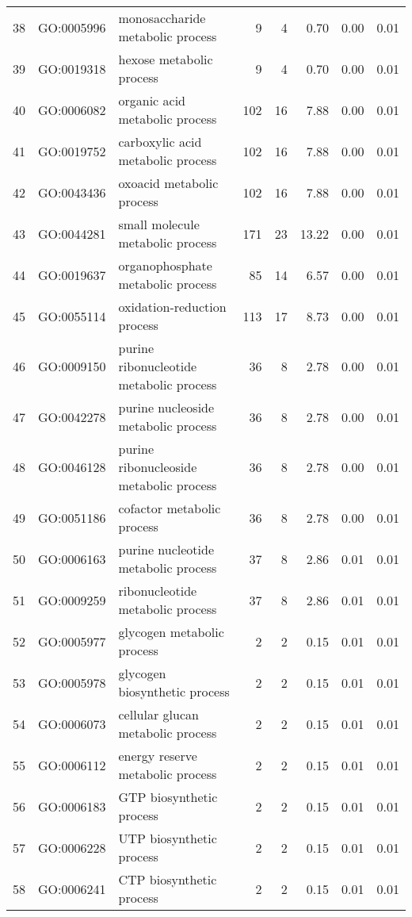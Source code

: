 \begin{table}[ht]
\begin{tabular}{rllrrrrr}
  38 & GO:0005996 & monosaccharide metabolic process &   9 &   4 & 0.70 & 0.00 & 0.01 \\ 
  39 & GO:0019318 & hexose metabolic process &   9 &   4 & 0.70 & 0.00 & 0.01 \\ 
  40 & GO:0006082 & organic acid metabolic process & 102 &  16 & 7.88 & 0.00 & 0.01 \\ 
  41 & GO:0019752 & carboxylic acid metabolic process & 102 &  16 & 7.88 & 0.00 & 0.01 \\ 
  42 & GO:0043436 & oxoacid metabolic process & 102 &  16 & 7.88 & 0.00 & 0.01 \\ 
  43 & GO:0044281 & small molecule metabolic process & 171 &  23 & 13.22 & 0.00 & 0.01 \\ 
  44 & GO:0019637 & organophosphate metabolic process &  85 &  14 & 6.57 & 0.00 & 0.01 \\ 
  45 & GO:0055114 & oxidation-reduction process & 113 &  17 & 8.73 & 0.00 & 0.01 \\ 
  46 & GO:0009150 & purine ribonucleotide metabolic process &  36 &   8 & 2.78 & 0.00 & 0.01 \\ 
  47 & GO:0042278 & purine nucleoside metabolic process &  36 &   8 & 2.78 & 0.00 & 0.01 \\ 
  48 & GO:0046128 & purine ribonucleoside metabolic process &  36 &   8 & 2.78 & 0.00 & 0.01 \\ 
  49 & GO:0051186 & cofactor metabolic process &  36 &   8 & 2.78 & 0.00 & 0.01 \\ 
  50 & GO:0006163 & purine nucleotide metabolic process &  37 &   8 & 2.86 & 0.01 & 0.01 \\ 
  51 & GO:0009259 & ribonucleotide metabolic process &  37 &   8 & 2.86 & 0.01 & 0.01 \\ 
  52 & GO:0005977 & glycogen metabolic process &   2 &   2 & 0.15 & 0.01 & 0.01 \\ 
  53 & GO:0005978 & glycogen biosynthetic process &   2 &   2 & 0.15 & 0.01 & 0.01 \\ 
  54 & GO:0006073 & cellular glucan metabolic process &   2 &   2 & 0.15 & 0.01 & 0.01 \\ 
  55 & GO:0006112 & energy reserve metabolic process &   2 &   2 & 0.15 & 0.01 & 0.01 \\ 
  56 & GO:0006183 & GTP biosynthetic process &   2 &   2 & 0.15 & 0.01 & 0.01 \\ 
  57 & GO:0006228 & UTP biosynthetic process &   2 &   2 & 0.15 & 0.01 & 0.01 \\ 
  58 & GO:0006241 & CTP biosynthetic process &   2 &   2 & 0.15 & 0.01 & 0.01 \\ 

\end{tabular}
\end{table}
